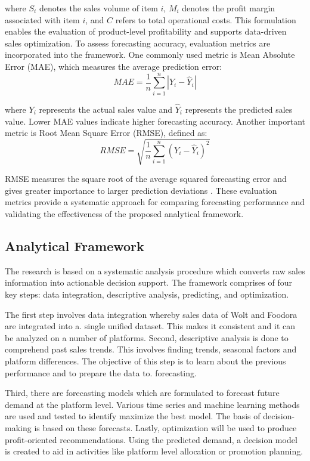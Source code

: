 where $S_i$ denotes the sales volume of item $i$,
$M_i$ denotes the profit margin associated with item $i$,
and $C$ refers to total operational costs. This formulation enables the evaluation of product-level profitability and supports data-driven sales optimization.
To assess forecasting accuracy, evaluation metrics are incorporated into the framework. One commonly used metric is Mean Absolute Error (MAE), which measures the average prediction error:
\begin{equation}
MAE = \frac{1}{n}\sum_{i=1}^{n}\left|Y_i - \hat{Y}_i\right|
\end{equation}

where $Y_i$ represents the actual sales value and $\hat{Y}_i$ represents the predicted sales value. Lower MAE values indicate higher forecasting accuracy. Another important metric is Root Mean Square Error (RMSE), defined as:
\begin{equation}
RMSE = \sqrt{\frac{1}{n}\sum_{i=1}^{n}(Y_i - \hat{Y}_i)^2}
\end{equation}

RMSE measures the square root of the average squared forecasting error and gives greater importance to larger prediction deviations \citep{hodson2022root}. These evaluation metrics provide a systematic approach for comparing forecasting performance and validating the effectiveness of the proposed
analytical framework.

\subsection{Analytical Framework}

The research is based on a systematic analysis procedure which converts raw sales information into actionable decision support. The framework comprises of four key steps: data integration, descriptive analysis, predicting, and optimization.

The first step involves data integration whereby sales data of Wolt and Foodora are integrated into a.
single unified dataset. This makes it consistent and it can be analyzed on a number of platforms. Second, descriptive analysis is done to comprehend past sales trends. This involves finding trends, seasonal factors and platform differences. The objective of this step is to learn about the previous performance and to prepare the data to.
forecasting.

Third, there are forecasting models which are formulated to forecast future demand at the platform level. Various time series and machine learning methods are used and tested to identify maximize the best model. The basis of decision-making is based on these forecasts.
Lastly, optimization will be used to produce profit-oriented recommendations. Using the predicted demand, a decision model is created to aid in activities like platform level allocation or promotion planning.

